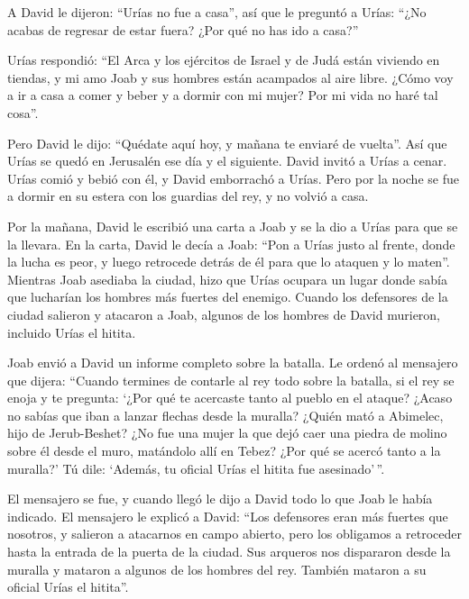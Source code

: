  A David le dijeron: ``Urías no fue a casa'', así que le
preguntó a Urías: ``¿No acabas de regresar de estar fuera? ¿Por qué no
has ido a casa?''

 Urías respondió: ``El Arca y los ejércitos de Israel y de
Judá están viviendo en tiendas, y mi amo Joab y sus hombres están
acampados al aire libre. ¿Cómo voy a ir a casa a comer y beber y a
dormir con mi mujer? Por mi vida no haré tal cosa''.

 Pero David le dijo: ``Quédate aquí hoy, y mañana te
enviaré de vuelta''. Así que Urías se quedó en Jerusalén ese día y el
siguiente.  David invitó a Urías a cenar. Urías comió y
bebió con él, y David emborrachó a Urías. Pero por la noche se fue a
dormir en su estera con los guardias del rey, y no volvió a casa.

 Por la mañana, David le escribió una carta a Joab y se la
dio a Urías para que se la llevara.  En la carta, David le
decía a Joab: ``Pon a Urías justo al frente, donde la lucha es peor, y
luego retrocede detrás de él para que lo ataquen y lo maten''.
 Mientras Joab asediaba la ciudad, hizo que Urías ocupara
un lugar donde sabía que lucharían los hombres más fuertes del enemigo.
 Cuando los defensores de la ciudad salieron y atacaron a
Joab, algunos de los hombres de David murieron, incluido Urías el
hitita.

 Joab envió a David un informe completo sobre la batalla.
 Le ordenó al mensajero que dijera: ``Cuando termines de
contarle al rey todo sobre la batalla,  si el rey se enoja
y te pregunta: `¿Por qué te acercaste tanto al pueblo en el ataque?
¿Acaso no sabías que iban a lanzar flechas desde la muralla?
 ¿Quién mató a Abimelec, hijo de Jerub-Beshet? ¿No fue una
mujer la que dejó caer una piedra de molino sobre él desde el muro,
matándolo allí en Tebez? ¿Por qué se acercó tanto a la muralla?' Tú
dile: `Además, tu oficial Urías el hitita fue asesinado'\,''.

 El mensajero se fue, y cuando llegó le dijo a David todo
lo que Joab le había indicado.  El mensajero le explicó a
David: ``Los defensores eran más fuertes que nosotros, y salieron a
atacarnos en campo abierto, pero los obligamos a retroceder hasta la
entrada de la puerta de la ciudad.  Sus arqueros nos
dispararon desde la muralla y mataron a algunos de los hombres del rey.
También mataron a su oficial Urías el hitita''.


